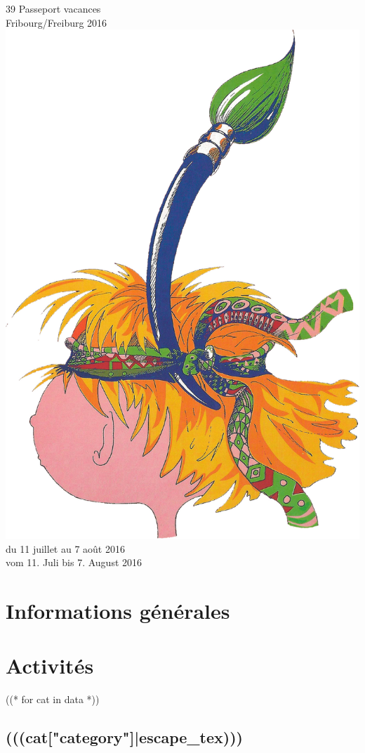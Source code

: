 \documentclass [parskip=full, paper=a4paper]{scrbook}
\begin{document}
\frontmatter
\begin{titlepage}
\begin{center}
{\fontsize{45}{40}\selectfont{}39\ieme{} Passeport vacances\\
\vspace*{3mm}
Fribourg/Freiburg 2016}
\vfill
\includegraphics[width=.7\textwidth]{logo.jpg}
\vfill
{\fontsize{32}{32}\selectfont{}du 11 juillet au 7 août 2016}\\
\vspace*{3mm}
{\fontsize{32}{32}\selectfont{}vom 11. Juli bis 7. August 2016}

\end{center}
\end{titlepage}
\clearpage

\cleardoublepage
\tableofcontents
\cleardoublepage

\mainmatter

\part{Informations générales}


\part{Activités}
((* for cat in data *))
\chapter{(((cat["category"]|escape_tex)))}
\end{document}
